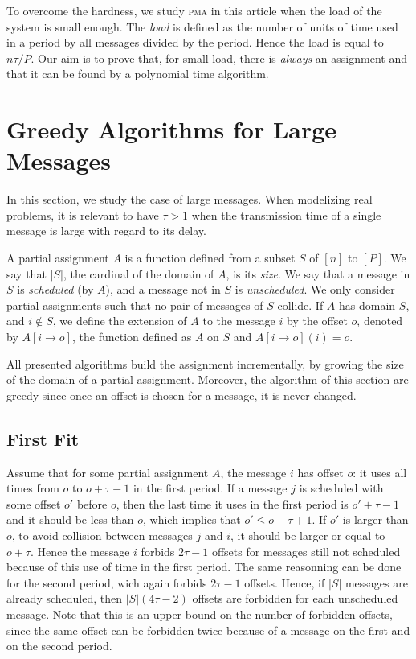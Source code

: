 \documentclass[10pt, conference, letterpaper]{IEEEtran}
\newcommand\pma{\textsc{pma}\xspace}
\begin{document}
To overcome the hardness, we study \pma in this article when the load of the system is small enough. The \emph{load} is defined as the number of units of time used in a period by all messages divided by the period. Hence the load is equal to $n\tau /P$. Our aim is to prove that, for small load, there is \emph{always} an assignment and that it can be found by a polynomial time algorithm.



\section{Greedy Algorithms for Large Messages} \label{sec:large}

In this section, we study the case of large messages. When modelizing real problems,
it is relevant to have $\tau > 1$ when the transmission time of a single message is large with regard to its delay.


A partial assignment $A$ is a function defined from a subset $S$ of $[n]$ to $[P]$.
We say that $|S|$, the cardinal of the domain of $A$, is its \emph{size}.
We say that a message in $S$ is \emph{scheduled} (by $A$), and a message not in $S$ is \emph{unscheduled}. We only consider partial assignments such that no pair of messages of $S$ collide. If $A$ has domain $S$, and $i \notin S$, we define the extension of $A$ to the message $i$ by the offset $o$, denoted by $A[i \rightarrow o]$, the function defined as $A$ on $S$ and $A[i \rightarrow o](i) = o$.

All presented algorithms build the assignment incrementally, by growing the size of the domain of a partial assignment. Moreover, the algorithm of this section are greedy since once an offset is chosen for a message, it is never changed.


\subsection{First Fit}


Assume that for some partial assignment $A$, the message $i$ has offset $o$: it uses all times from $o$ to $o + \tau -1$ in the first period. If a message $j$ is scheduled with some offset $o'$ before $o$, then the last time it uses in the first period is $o'+\tau-1$ and it should be less than $o$, which implies that $o' \leq o - \tau + 1$. If $o'$ is larger than $o$, to avoid collision between messages $j$ and $i$, it should be larger or equal to $o+ \tau$. Hence the message $i$ forbids $2\tau -1$ offsets for messages still not scheduled because of this use of time in the first period. The same reasonning can be done for the second period, wich again forbids $2\tau -1$ offsets. Hence, if $|S|$ messages are already scheduled, then $|S|(4\tau -2)$ offsets are forbidden for each unscheduled message. Note that this is an upper bound on the number of forbidden offsets, since the same offset can be forbidden twice because of a message on the first and on the second period.
\end{document}
